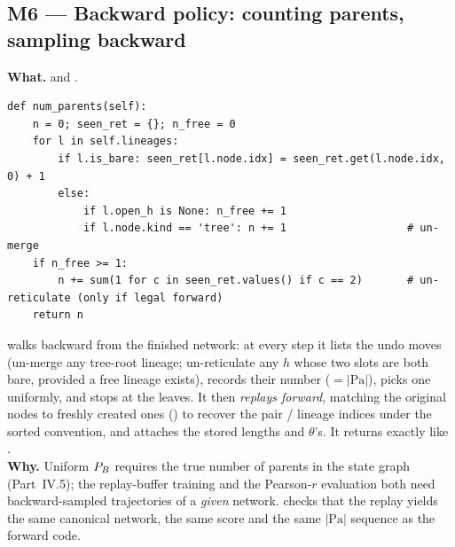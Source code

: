 \subsection{M6 --- Backward policy: counting parents, sampling backward}
\textbf{What.}  and .
\begin{lstlisting}
def num_parents(self):
    n = 0; seen_ret = {}; n_free = 0
    for l in self.lineages:
        if l.is_bare: seen_ret[l.node.idx] = seen_ret.get(l.node.idx, 0) + 1
        else:
            if l.open_h is None: n_free += 1
            if l.node.kind == 'tree': n += 1                   # un-merge
    if n_free >= 1:
        n += sum(1 for c in seen_ret.values() if c == 2)       # un-reticulate (only if legal forward)
    return n
\end{lstlisting}
 walks backward from the finished network: at every step it lists the undo moves (un-merge any tree-root lineage; un-reticulate any $h$ whose two slots are both bare, provided a free lineage exists), records their number ($=|\mathrm{Pa}|$), picks one uniformly, and stops at the leaves. It then \emph{replays forward}, matching the original nodes to freshly created ones () to recover the pair / lineage indices under the sorted convention, and attaches the stored lengths and $\theta$'s. It returns  exactly like .\\
\textbf{Why.} Uniform $P_B$ requires the true number of parents in the state graph (Part~IV.5); the replay-buffer training and the Pearson-$r$ evaluation both need backward-sampled trajectories of a \emph{given} network.  checks that the replay yields the same canonical network, the same score and the same $|\mathrm{Pa}|$ sequence as the forward code.

